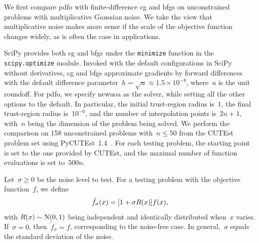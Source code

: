 \documentclass[manuscript,screen,review]{acmart}
\numberwithin{equation}{section}
\newcommand*{\NN}{\mathrm{N}}
\newcommand*{\iter}[1][k]{x\ifthenelse{\equal{#1}{}}{}{_{#1}}}
\newcommand*{\obj}{f}
\begin{document}
We first compare \gls{pdfo} with finite-difference \gls{cg} and \gls{bfgs} on unconstrained problems with multiplicative Gaussian noise.
We take the view that multiplicative noise makes more sense if the scale of the objective function changes widely, as is often the case in applications.

SciPy provides both \gls{cg} and \gls{bfgs} under the \texttt{minimize} function in the \texttt{scipy.optimize} module.
Invoked with the default configurations in SciPy without derivatives, \gls{cg} and \gls{bfgs} approximate gradients by forward differences with the default difference parameter~$h = \sqrt{u} \approx 1.5\times 10^{-8}$, where~$u$ is the unit roundoff.
For \gls{pdfo}, we specify \gls{newuoa} as the solver, while setting all the other options to the default.
In particular, the initial trust-region radius is~$1$, the final trust-region radius is~$10^{-6}$, and the number of interpolation points is~$2n + 1$, with~$n$ being the dimension of the problem being solved.
We perform the comparison on \num{158} unconstrained problems with~$n \le 50$ from the CUTEst~\cite{Gould_Orban_Toint_2015} problem set using PyCUTEst~1.4~\cite{Fowkes_Roberts_Burmen_2022}.
For each testing problem, the starting point is set to the one provided by CUTEst, and the maximal number of function evaluations is set to~$500n$.

Let~$\sigma \ge 0$ be the noise level to test.
For a testing problem with the objective function~$\obj$, we define
\begin{equation}
    \label{eq:noisy-obj}
    \tilde{\obj}_\sigma(\iter[]) = [1 + \sigma R(\iter[])] \obj(\iter[]),
\end{equation}
with $R(\iter[])\sim \NN(0, 1)$ being independent and identically distributed when~$x$ varies.
If~$\sigma = 0$, then~$\tilde{f}_\sigma = f$, corresponding to the noise-free case.
In general,~$\sigma$ equals the standard deviation of the noise.
\end{document}

